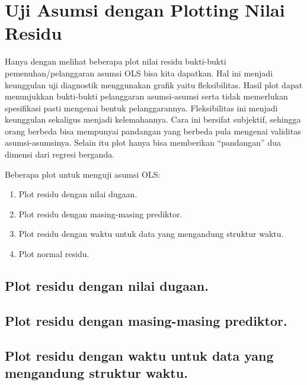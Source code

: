 \documentclass[
]{book}
\providecommand{\tightlist}{%
  \setlength{\itemsep}{0pt}\setlength{\parskip}{0pt}}
\begin{document}
\hypertarget{uji-asumsi-dengan-plotting-nilai-residu}{%
\section{Uji Asumsi dengan Plotting Nilai Residu}\label{uji-asumsi-dengan-plotting-nilai-residu}}

Hanya dengan melihat beberapa plot nilai residu bukti-bukti pemenuhan/pelanggaran asumsi OLS bisa kita dapatkan. Hal ini menjadi keunggulan uji diagnostik menggunakan grafik yaitu fleksibilitas. Hasil plot dapat menunjukkan bukti-bukti pelanggaran asumsi-asumsi serta tidak memerlukan spesifikasi pasti mengenai bentuk pelanggarannya. Fleksibilitas ini menjadi keunggulan sekaligus menjadi kelemahannya. Cara ini bersifat subjektif, sehingga orang berbeda bisa mempunyai pandangan yang berbeda pula mengenai validitas asumsi-asumsinya. Selain itu plot hanya bisa memberikan ``pandangan'' dua dimensi dari regresi berganda.

Beberapa plot untuk menguji asumsi OLS:

\begin{enumerate}
\def\labelenumi{\arabic{enumi}.}
\tightlist
\item
  Plot residu dengan nilai dugaan.
\item
  Plot residu dengan masing-masing prediktor.
\item
  Plot residu dengan waktu untuk data yang mengandung struktur waktu.
\item
  Plot normal residu.
\end{enumerate}

\hypertarget{plot-residu-dengan-nilai-dugaan.}{%
\subsection{Plot residu dengan nilai dugaan.}\label{plot-residu-dengan-nilai-dugaan.}}

\hypertarget{plot-residu-dengan-masing-masing-prediktor.}{%
\subsection{Plot residu dengan masing-masing prediktor.}\label{plot-residu-dengan-masing-masing-prediktor.}}

\hypertarget{plot-residu-dengan-waktu-untuk-data-yang-mengandung-struktur-waktu.}{%
\subsection{Plot residu dengan waktu untuk data yang mengandung struktur waktu.}\label{plot-residu-dengan-waktu-untuk-data-yang-mengandung-struktur-waktu.}}
\end{document}
